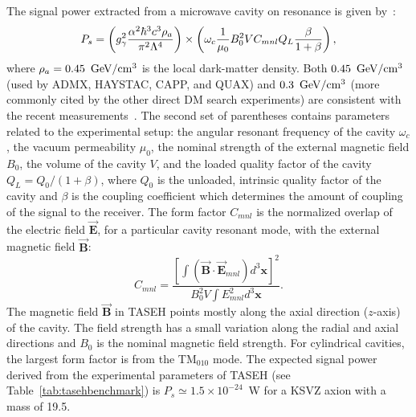 The signal power extracted from a microwave cavity on resonance is given 
by~\cite{HAYSTACIII}:
\begin{equation}
P_s = \left(g_{\gamma}^2\frac{\alpha^2\hbar^3c^3\rho_a}{\pi^2\Lambda^4}\right)\times
\left(\omega_c\frac{1}{\mu_0}B_0^2VC_{mnl}Q_L\frac{\beta}{1+\beta}\right),
\label{eq:ps}
\end{equation}
where $\rho_a=0.45~\,\text{Ge\hspace{-.08em}V}/\mathrm{cm}^3$ is the local dark-matter 
density. 
Both $0.45~\,\text{Ge\hspace{-.08em}V}/\mathrm{cm}^3$ (used by ADMX, HAYSTAC, 
CAPP, and QUAX) and $0.3~\,\text{Ge\hspace{-.08em}V}/\mathrm{cm}^3$ (more commonly cited 
by the other direct DM search experiments) are consistent with the recent 
measurements~\cite{Read:2014qva,PDG}. 
The second set of parentheses contains parameters related to the experimental 
setup: the angular resonant frequency of the cavity $\omega_c$, 
the vacuum permeability $\mu_0$, the nominal strength of the external magnetic 
field $B_0$, the volume of the cavity $V$, and the loaded quality factor of 
the cavity 
\(Q_L=Q_0/(1+\beta)\), where $Q_0$ is the unloaded, intrinsic quality factor 
of the cavity and $\beta$ is the coupling coefficient which determines the 
amount 
of coupling of the signal to the receiver. The form factor $C_{mnl}$ is the 
normalized overlap of the electric field 
$\vec{\bm{E}}$, for a particular cavity resonant mode, with the external magnetic 
field $\vec{\bm{B}}$:
\begin{equation}
  C_{mnl} = \frac{\left[\int\left( \vec{\bm{B}}\cdot\vec{\bm{E}}_{mnl}\right) d^3\bm{x}\right]^2}{B_0^2V\int E_{mnl}^2 d^3\bm{x}}.
\label{eq:formfactor} 
\end{equation} 
The magnetic field $\vec{\bm{B}}$ in TASEH points mostly along the axial 
direction ($z$-axis) of the cavity. 
The field strength has a small variation along the radial and axial 
directions and $B_0$ is the nominal magnetic field strength. 
For cylindrical cavities, the largest form factor is from the 
TM$_{010}$ mode. The expected signal power derived from the experimental 
parameters of TASEH (see Table~\ref{tab:tasehbenchmark}) 
is $P_s\simeq 1.5\times10^{-24}$~W for a KSVZ axion with a 
mass of 19.5\muevcc. 

